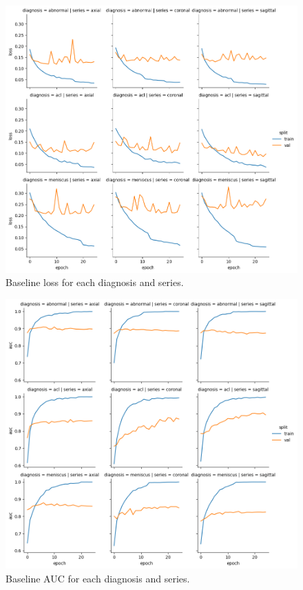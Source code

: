 \documentclass[10pt,twocolumn,letterpaper]{article}
\begin{document}
\begin{figure}
\begin{center}
\includegraphics[width=0.8\linewidth]{../images/MRNet_loss.png}
\end{center}
   \caption{Baseline loss for each diagnosis and series.}
\label{fig:mrnet_loss}
\end{figure}

\begin{figure}
\begin{center}
\includegraphics[width=0.8\linewidth]{../images/MRNet_auc.png}
\end{center}
   \caption{Baseline AUC for each diagnosis and series.}
\label{fig:mrnet_auc}
\end{figure}
\end{document}
